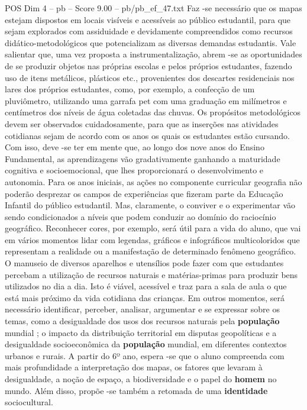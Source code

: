 \begin{textsample}{POS Dim 4 – pb – Score 9.00 – pb/pb\_ef\_47.txt}
Faz -se necessário que os mapas estejam dispostos em locais visíveis e acessíveis ao público estudantil, para que sejam explorados com assiduidade e devidamente compreendidos como recursos didático-metodológicos que potencializam as diversas demandas estudantis.
Vale salientar que, uma vez proposta a instrumentalização, abrem -se as oportunidades de se produzir objetos nas próprias escolas e pelos próprios estudantes, fazendo uso de itens metálicos, plásticos etc., provenientes dos descartes residenciais nos lares dos próprios estudantes, como, por exemplo, a confecção de um pluviômetro, utilizando uma garrafa pet com uma graduação em milímetros e centímetros dos níveis de água coletadas das chuvas.
Os propósitos metodológicos devem ser observados cuidadosamente, para que as inserções nas atividades cotidianas sejam de acordo com os anos os quais os estudantes estão cursando.
Com isso, deve -se ter em mente que, ao longo dos nove anos do Ensino Fundamental, as aprendizagens vão gradativamente ganhando a maturidade cognitiva e socioemocional, que lhes proporcionará o desenvolvimento e autonomia.
Para os anos iniciais, as ações no componente curricular geografia não poderão desprezar os campos de experiências que fizeram parte da Educação Infantil do público estudantil.
Mas, claramente, o conviver e o experimentar vão sendo condicionados a níveis que podem conduzir ao domínio do raciocínio geográfico.
Reconhecer cores, por exemplo, será útil para a vida do aluno, que vai em vários momentos lidar com legendas, gráficos e infográficos multicoloridos que representam a realidade ou a manifestação de determinado fenômeno geográfico.
O manuseio de diversos aparelhos e utensílios pode fazer com que estudantes percebam a utilização de recursos naturais e matérias-primas para produzir bens utilizados no dia a dia.
Isto é viável, acessível e traz para a sala de aula o que está mais próximo da vida cotidiana das crianças.
Em outros momentos, será necessário identificar, perceber, analisar, argumentar e se expressar sobre os temas, como a desigualdade dos usos dos recursos naturais pela \textbf{população} mundial ; o impacto da distribuição territorial em disputas geopolíticas e a desigualdade socioeconômica da \textbf{população} mundial, em diferentes contextos urbanos e rurais.
A partir do 6º ano, espera -se que o aluno compreenda com mais profundidade a interpretação dos mapas, os fatores que levaram à desigualdade, a noção de espaço, a biodiversidade e o papel do \textbf{homem} no mundo.
Além disso, propõe -se também a retomada de uma \textbf{identidade} sociocultural.

\end{textsample}
